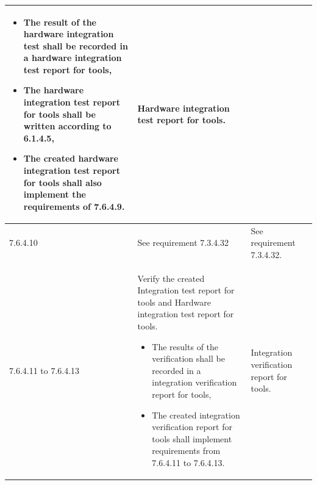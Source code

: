 \documentclass{template/openetcs_report}
\begin{document}
{\begin{longtable}{|p{2cm}|p{9cm}|p{3cm}|}
\begin{itemize}\itemsep=0pt
  \item The result of the hardware integration test shall be recorded in a hardware integration test report for tools,
  \item The hardware integration test report for tools shall be written according to 6.1.4.5, 
  \item The created hardware integration test report for tools shall also implement the requirements of 7.6.4.9. 
\end{itemize}
& Hardware integration test report for tools.\\ 
\hline
7.6.4.10 & See requirement 7.3.4.32 & See requirement 7.3.4.32.\\ 
\hline
7.6.4.11 to 7.6.4.13 & Verify the created Integration test report for tools and Hardware integration test report for tools.
\begin{itemize}\itemsep=0pt
  \item The results of the verification shall be recorded in a integration verification report for tools,
  \item The created integration verification report for tools shall implement requirements from 7.6.4.11 to 7.6.4.13. 
\end{itemize}
& Integration verification report for tools.\\ 
\hline
\end{longtable}}
\end{document}
